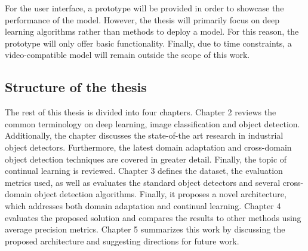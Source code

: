 For the user interface, a prototype will be provided in order to showcase the performance of the model. However, the thesis will primarily focus on deep learning algorithms rather than methods to deploy a model. For this reason, the prototype will only offer basic functionality. Finally, due to time constraints, a video-compatible model will remain outside the scope of this work. 



\subsection{Structure of the thesis}
The rest of this thesis is divided into four chapters. Chapter 2 reviews the common terminology on deep learning, image classification and object detection. Additionally, the chapter discusses the state-of-the art research in industrial object detectors. Furthermore, the latest domain adaptation and cross-domain object detection techniques are covered in greater detail. Finally, the topic of continual learning is reviewed. Chapter 3 defines the dataset, the evaluation metrics used, as well as evaluates the standard object detectors and several cross-domain object detection algorithms. Finally, it proposes a novel architecture, which addresses both domain adaptation and continual learning. Chapter 4 evaluates the proposed solution and compares the results to other methods using average precision metrics. Chapter 5 summarizes this work by discussing the proposed architecture and suggesting directions for future work.

\clearpage